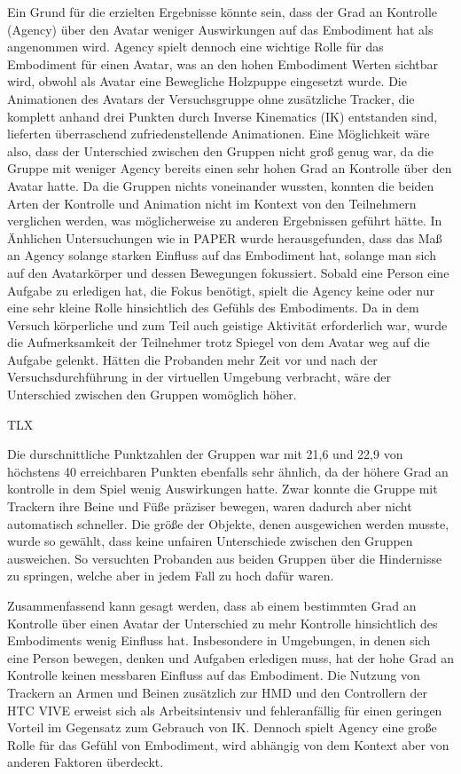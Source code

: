 Ein Grund für die erzielten Ergebnisse könnte sein, dass der Grad an Kontrolle (Agency) über den Avatar weniger Auswirkungen auf das Embodiment hat als angenommen wird. Agency spielt dennoch eine wichtige Rolle für das Embodiment für einen Avatar, was an den hohen Embodiment Werten sichtbar wird, obwohl als Avatar eine Bewegliche Holzpuppe eingesetzt wurde. Die Animationen des Avatars der Versuchsgruppe ohne zusätzliche Tracker, die komplett anhand drei Punkten durch Inverse Kinematics (IK) entstanden sind, lieferten überraschend zufriedenstellende Animationen. Eine Möglichkeit wäre also, dass der Unterschied zwischen den Gruppen nicht groß genug war, da die Gruppe mit weniger Agency bereits einen sehr hohen Grad an Kontrolle über den Avatar hatte. Da die Gruppen nichts voneinander wussten, konnten die beiden Arten der Kontrolle und Animation nicht im Kontext von den Teilnehmern verglichen werden, was möglicherweise zu anderen Ergebnissen geführt hätte.
In Änhlichen Untersuchungen wie in PAPER wurde herausgefunden, dass das Maß an Agency solange starken Einfluss auf das Embodiment hat, solange man sich auf den Avatarkörper und dessen Bewegungen fokussiert. Sobald eine Person eine Aufgabe zu erledigen hat, die Fokus benötigt,  spielt die Agency keine oder nur eine sehr kleine Rolle hinsichtlich des Gefühls des Embodiments. Da in dem Versuch körperliche und zum Teil auch geistige Aktivität erforderlich war, wurde die Aufmerksamkeit der Teilnehmer trotz Spiegel von dem Avatar weg auf die Aufgabe gelenkt. Hätten die Probanden mehr Zeit vor und nach der Versuchsdurchführung in der virtuellen Umgebung verbracht, wäre der Unterschied zwischen den Gruppen womöglich höher.

TLX

Die durschnittliche Punktzahlen der Gruppen war mit 21,6 und 22,9 von höchstens 40 erreichbaren Punkten ebenfalls sehr ähnlich, da der höhere Grad an kontrolle in dem Spiel wenig Auswirkungen hatte. Zwar konnte die Gruppe mit Trackern ihre Beine und Füße präziser bewegen, waren dadurch aber nicht automatisch schneller. Die größe der Objekte, denen ausgewichen werden musste, wurde so gewählt, dass keine unfairen Unterschiede zwischen den Gruppen ausweichen. So versuchten Probanden aus beiden Gruppen über die Hindernisse zu springen, welche aber in jedem Fall zu hoch dafür waren.





Zusammenfassend kann gesagt werden, dass ab einem bestimmten Grad an Kontrolle über einen Avatar der Unterschied zu mehr Kontrolle hinsichtlich des Embodiments wenig Einfluss hat. Insbesondere in Umgebungen, in denen sich eine Person bewegen, denken und Aufgaben erledigen muss, hat der hohe Grad an Kontrolle keinen messbaren Einfluss auf das Embodiment. Die Nutzung von Trackern an Armen und Beinen zusätzlich zur HMD und den Controllern der HTC VIVE erweist sich als Arbeitsintensiv und fehleranfällig für einen geringen Vorteil im Gegensatz zum Gebrauch von IK. Dennoch spielt Agency eine große Rolle für das Gefühl von Embodiment, wird abhängig von dem Kontext aber von anderen Faktoren überdeckt.


